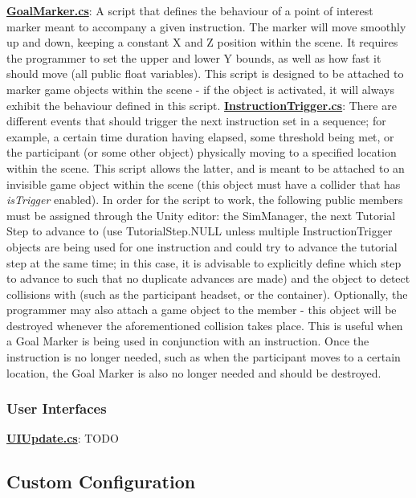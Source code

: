\documentclass{article}
\begin{document}
\href{https://bit.ly/2Yooc2m}{\textbf{GoalMarker.cs}}: A script that defines the behaviour of a point of interest marker meant to accompany a given instruction. The marker will move smoothly up and down, keeping a constant X and Z position within the scene. It requires the programmer to set the upper and lower Y bounds, as well as how fast it should move (all public float variables). This script is designed to be attached to marker game objects within the scene - if the object is activated, it will always exhibit the behaviour defined in this script. \newline \newline
\href{https://bit.ly/2uwAQ1u}{\textbf{InstructionTrigger.cs}}: There are different events that should trigger the next instruction set in a sequence; for example, a certain time duration having elapsed, some threshold being met, or the participant (or some other object) physically moving to a specified location within the scene. This script allows the latter, and is meant to be attached to an invisible game object within the scene (this object must have a collider that has \textit{isTrigger} enabled). In order for the script to work, the following public members must be assigned through the Unity editor: the SimManager, the next Tutorial Step to advance to (use TutorialStep.NULL unless multiple InstructionTrigger objects are being used for one instruction and could try to advance the tutorial step at the same time; in this case, it is advisable to explicitly define which step to advance to such that no duplicate advances are made) and the object to detect collisions with (such as the participant headset, or the container). Optionally, the programmer may also attach a game object to the  member - this object will be destroyed whenever the aforementioned collision takes place. This is useful when a Goal Marker is being used in conjunction with an instruction. Once the instruction is no longer needed, such as when the participant moves to a certain location, the Goal Marker is also no longer needed and should be destroyed. 


\subsubsection*{User Interfaces}
\href{https://bit.ly/2OrcNdx}{\textbf{UIUpdate.cs}}: TODO \newline \newline


\subsection*{Custom Configuration} %
\end{document}
